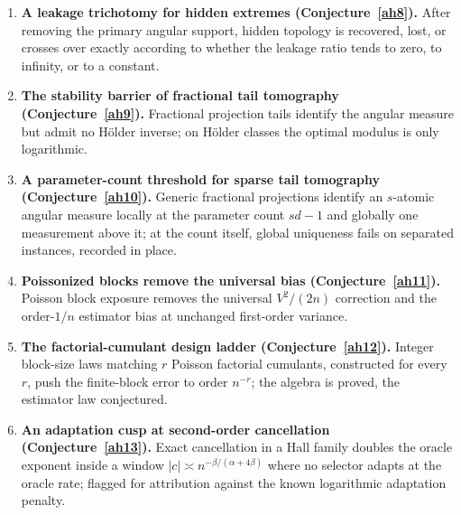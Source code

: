 \documentclass[11pt]{article}
\theoremstyle{definition}
\begin{document}
\begin{enumerate}
\item \textbf{A leakage trichotomy for hidden extremes (Conjecture~\ref{ah8}).}  After removing the primary angular support, hidden topology is recovered, lost, or crosses over exactly according to whether the leakage ratio tends to zero, to infinity, or to a constant.
\item \textbf{The stability barrier of fractional tail tomography (Conjecture~\ref{ah9}).}  Fractional projection tails identify the angular measure but admit no H\"older inverse; on H\"older classes the optimal modulus is only logarithmic.
\item \textbf{A parameter-count threshold for sparse tail tomography (Conjecture~\ref{ah10}).}  Generic fractional projections identify an $s$-atomic angular measure locally at the parameter count $sd-1$ and globally one measurement above it; at the count itself, global uniqueness fails on separated instances, recorded in place.
\item \textbf{Poissonized blocks remove the universal bias (Conjecture~\ref{ah11}).}  Poisson block exposure removes the universal $V^2/(2n)$ correction and the order-$1/n$ estimator bias at unchanged first-order variance.
\item \textbf{The factorial-cumulant design ladder (Conjecture~\ref{ah12}).}  Integer block-size laws matching $r$ Poisson factorial cumulants, constructed for every $r$, push the finite-block error to order $n^{-r}$; the algebra is proved, the estimator law conjectured.
\item \textbf{An adaptation cusp at second-order cancellation (Conjecture~\ref{ah13}).}  Exact cancellation in a Hall family doubles the oracle exponent inside a window $|c|\asymp n^{-\beta/(\alpha+4\beta)}$ where no selector adapts at the oracle rate; flagged for attribution against the known logarithmic adaptation penalty.
\end{enumerate}
\end{document}
